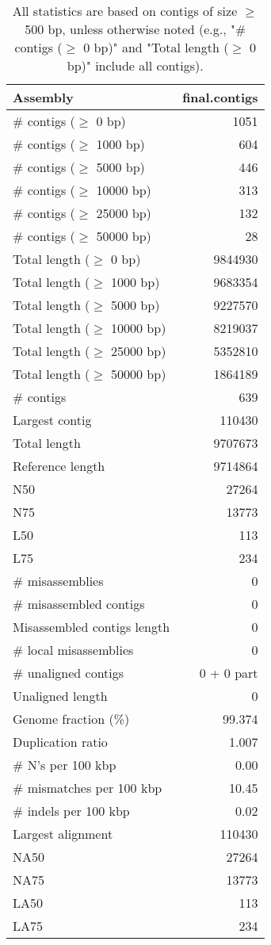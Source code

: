 \documentclass[12pt,a4paper]{article}
\begin{document}
\begin{table}[ht]
\begin{center}
\caption{All statistics are based on contigs of size $\geq$ 500 bp, unless otherwise noted (e.g., "\# contigs ($\geq$ 0 bp)" and "Total length ($\geq$ 0 bp)" include all contigs).}
\begin{tabular}{|l*{1}{|r}|}
\hline
Assembly & final.contigs \\ \hline
\# contigs ($\geq$ 0 bp) & 1051 \\ \hline
\# contigs ($\geq$ 1000 bp) & 604 \\ \hline
\# contigs ($\geq$ 5000 bp) & 446 \\ \hline
\# contigs ($\geq$ 10000 bp) & 313 \\ \hline
\# contigs ($\geq$ 25000 bp) & 132 \\ \hline
\# contigs ($\geq$ 50000 bp) & 28 \\ \hline
Total length ($\geq$ 0 bp) & 9844930 \\ \hline
Total length ($\geq$ 1000 bp) & 9683354 \\ \hline
Total length ($\geq$ 5000 bp) & 9227570 \\ \hline
Total length ($\geq$ 10000 bp) & 8219037 \\ \hline
Total length ($\geq$ 25000 bp) & 5352810 \\ \hline
Total length ($\geq$ 50000 bp) & 1864189 \\ \hline
\# contigs & 639 \\ \hline
Largest contig & 110430 \\ \hline
Total length & 9707673 \\ \hline
Reference length & 9714864 \\ \hline
N50 & 27264 \\ \hline
N75 & 13773 \\ \hline
L50 & 113 \\ \hline
L75 & 234 \\ \hline
\# misassemblies & 0 \\ \hline
\# misassembled contigs & 0 \\ \hline
Misassembled contigs length & 0 \\ \hline
\# local misassemblies & 0 \\ \hline
\# unaligned contigs & 0 + 0 part \\ \hline
Unaligned length & 0 \\ \hline
Genome fraction (\%) & 99.374 \\ \hline
Duplication ratio & 1.007 \\ \hline
\# N's per 100 kbp & 0.00 \\ \hline
\# mismatches per 100 kbp & 10.45 \\ \hline
\# indels per 100 kbp & 0.02 \\ \hline
Largest alignment & 110430 \\ \hline
NA50 & 27264 \\ \hline
NA75 & 13773 \\ \hline
LA50 & 113 \\ \hline
LA75 & 234 \\ \hline
\end{tabular}
\end{center}
\end{table}
\end{document}

